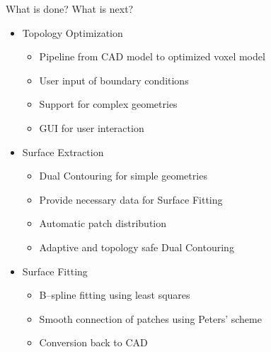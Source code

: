 \begin{frame}{What is done? What is next?}
\begin{itemize}

\item<+-> Topology Optimization
\begin{itemize}
	\item[\textcolor{green}{\Checkmark}] Pipeline from CAD model to optimized voxel model
	\item[\textcolor{green}{\Checkmark}] User input of boundary conditions
	\item[\textcolor{black}{\VarClock}] Support for complex geometries
	\item[\textcolor{red}{\XSolidBrush}] GUI for user interaction
\end{itemize}

\item<+-> Surface Extraction
\begin{itemize}
	\item[\textcolor{green}{\Checkmark}] Dual Contouring for simple geometries
	\item[\textcolor{green}{\Checkmark}] Provide necessary data for Surface Fitting
	\item[\textcolor{black}{\VarClock}] Automatic patch distribution
	\item[\textcolor{red}{\XSolidBrush}] Adaptive and topology safe Dual Contouring
\end{itemize}

\item<+-> Surface Fitting
\begin{itemize}
	\item[\textcolor{green}{\Checkmark}] B--spline fitting using least squares
	\item[\textcolor{green}{\Checkmark}] Smooth connection of patches using Peters' scheme
	\item[\textcolor{red}{\XSolidBrush}] Conversion back to CAD
\end{itemize}
\end{itemize}
\end{frame}









